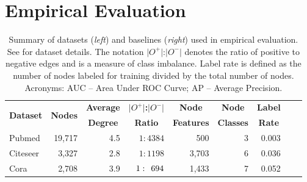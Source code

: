 \documentclass{article}
\begin{document}
\section{Empirical Evaluation}

\begin{table}[ht]
\caption[Caption1]{Summary of datasets (\emph{left}) and baselines (\emph{right}) used in empirical evaluation. See \cite{Sen:2008,Wang:2016} for dataset details. The notation $\vert\mathit{O}^+\vert$:$\vert\mathit{O}^-\vert$ denotes the ratio of positive to negative edges and is a measure of class imbalance. Label rate is defined as the number of nodes labeled for training divided by the total number of nodes. Acronyms: AUC -- Area Under ROC Curve; AP -- Average Precision.}
\begin{minipage}[t]{0.5\textwidth}
\begin{center}
\begin{adjustbox}{width=0.95\textwidth}
	\begin{tabular} {l  r  r  r  r  r  r  r  r}
	\hline
	\multicolumn{1}{l}{\multirow{2}{*}{\textbf{Dataset}}} &
	\multicolumn{1}{c}{\multirow{2}{*}{\textbf{Nodes}}} &
    \multicolumn{1}{c}{\multirow{1}{*}{\textbf{Average}}} &
	\multicolumn{1}{c}{\multirow{1}{*}{\textbf{$\vert\mathit{O}^+\vert$:$\vert\mathit{O}^-\vert$}}} &
	\multicolumn{1}{c}{\multirow{1}{*}{\textbf{Node}}} &
	\multicolumn{1}{c}{\multirow{1}{*}{\textbf{Node}}} &
	\multicolumn{1}{c}{\multirow{1}{*}{\textbf{Label}}} \\
    & {}
    & \multicolumn{1}{c}{\multirow{1}{*}{\textbf{Degree}}}
    & \multicolumn{1}{c}{\multirow{1}{*}{\textbf{Ratio}}}
    & \multicolumn{1}{c}{\multirow{1}{*}{\textbf{Features}}}
    & \multicolumn{1}{c}{\multirow{1}{*}{\textbf{Classes}}}
    & \multicolumn{1}{c}{\multirow{1}{*}{\textbf{Rate}}} \\
    \hline \hline
    Pubmed
				& 19,717
				& 4.5
                & $1:4384$
				& 500
				& 3
				& 0.003 \\
    Citeseer
				& 3,327 
				& 2.8
                & $1:1198$
				& 3,703
				& 6
				& 0.036 \\
	Cora	
				& 2,708
				& 3.9
                & $1: \hspace{4.5pt} 694$
				& 1,433
				& 7
				& 0.052 \\

\end{tabular}
\end{adjustbox}
\end{center}
\end{minipage}
\end{table}
\end{document}
